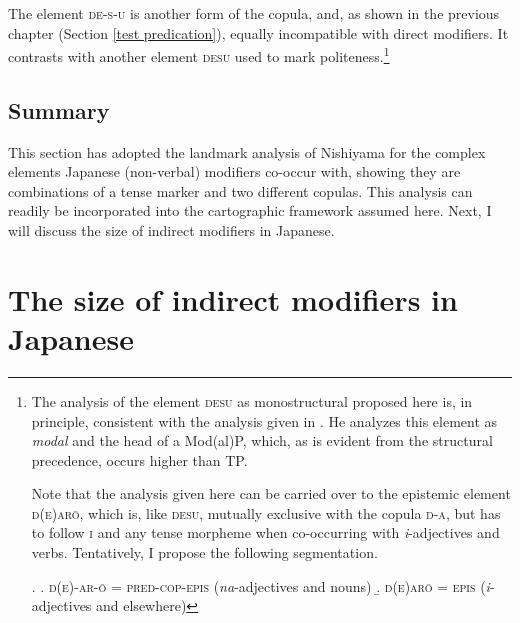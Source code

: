 The element \textsc{de-s-u} is another form of the copula, and, as shown in the previous chapter (Section \ref{test predication}), equally incompatible with direct modifiers. It contrasts with another element \textsc{desu} used to mark politeness.\footnote{The analysis of the element \textsc{desu} as monostructural proposed here is, in principle, consistent with the analysis given in \citet[64–67]{miyagawa:2022:syntax}. He analyzes this element as \textit{modal} and the head of a Mod(al)P, which, as is evident from the structural precedence, occurs higher than TP.

\par

Note that the analysis given here can be carried over to the epistemic element \textsc{d(e)arō}, which is, like \textsc{desu}, mutually exclusive with the copula \textsc{d-a}, but has to follow \textsc{i} and any tense morpheme when co-occurring with \textit{i}-adjectives and verbs. Tentatively, I propose the following segmentation.

\par


\ex. \a. \textsc{d(e)-ar-ō} = \textsc{pred-cop-epis} (\textit{na}-adjectives and nouns)
\b. \textsc{d(e)arō} = \textsc{epis} (\textit{i}-adjectives and elsewhere)

\par

}

\subsection{Summary}

This section has adopted the landmark analysis of Nishiyama for the complex elements Japanese (non-verbal) modifiers co-occur with, showing they are combinations of a tense marker and two different copulas. This analysis can readily be incorporated into the cartographic framework assumed here. Next, I will discuss the size of indirect modifiers in Japanese.

\section{The size of indirect modifiers in Japanese} \label{size,indirect}

